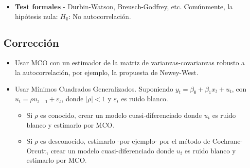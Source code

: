 \documentclass[10pt, a4paper, landscape]{extarticle}
\begin{document}
\begin{multicols}{3}
\begin{itemize}[leftmargin=*]
\begin{multicols}{3}
			\end{multicols}
			\item \textbf{Test formales} - Durbin-Watson, Breusch-Godfrey, etc. Comúnmente, la hipótesis nula: $H_0$: No autocorrelación.
		\end{itemize}
	\subsection*{Corrección}
		\begin{itemize}[leftmargin=*]
			\item Usar MCO con un estimador de la matriz de varianzas-covarianzas robusto a la autocorrelación, por ejemplo, la propuesta de Newey-West.
			\item Usar Mínimos Cuadrados Generalizados. Suponiendo $y_t = \beta_0 + \beta_1 x_t + u_t$, con $u_t = \rho u_{t-1} + \varepsilon_t$, donde $|\rho| < 1$ y $\varepsilon_t$ es ruido blanco.
			\begin{itemize}[leftmargin=*]
				\item Si $\rho$ es conocido, crear un modelo cuasi-diferenciado donde $u_t$ es ruido blanco y estimarlo por MCO.
				\item Si $\rho$ es desconocido, estimarlo -por ejemplo- por el método de Cochrane-Orcutt, crear un modelo cuasi-diferenciado donde $u_t$ es ruido blanco y estimarlo por MCO.
			\end{itemize}
		\end{itemize}
\end{multicols}
\end{document}
